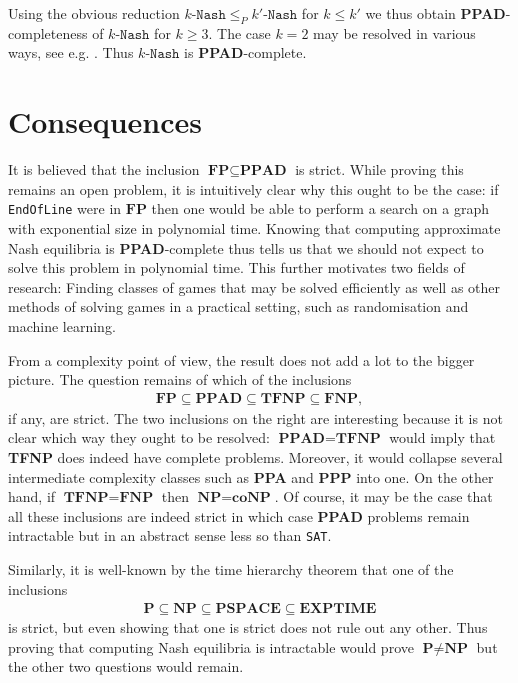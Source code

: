 \documentclass{article}
\begin{document}
Using the obvious reduction $k\texttt{-Nash}\leq_P k'\texttt{-Nash}$
for $k\leq k'$ we thus obtain \textbf{PPAD}-completeness of $k\texttt{-Nash}$
for $k\geq 3$.
The case $k=2$ may be resolved in various ways, see e.g.
\cite{chen2007}. Thus $k\texttt{-Nash}$ is \textbf{PPAD}-complete.

\section{Consequences}

It is believed that the inclusion $\textbf{FP}\subseteq\textbf{PPAD}$ is strict.
While proving this remains an open problem, it is intuitively clear why this
ought to be the case: if \texttt{EndOfLine} were in $\textbf{FP}$ then one
would be able to perform a search on a graph with exponential size in
polynomial time. Knowing that computing approximate Nash equilibria is
\textbf{PPAD}-complete thus tells us that we should not expect to solve
this problem in polynomial time. This further motivates two fields of
research: Finding classes of games that may be solved efficiently as
well as other methods of solving games in a practical setting, such as
randomisation and machine learning.

From a complexity point of view, the result does not add a lot to the
bigger picture. The question remains of which of the inclusions
\begin{align*}
  \textbf{FP} \subseteq \textbf{PPAD} \subseteq \textbf{TFNP} \subseteq
  \textbf{FNP},
\end{align*}
if any, are strict. The two inclusions on the right are interesting
because it is not clear which way they ought to be resolved:
$\textbf{PPAD}=\textbf{TFNP}$ would imply that \textbf{TFNP} does
indeed have complete problems. Moreover, it would collapse
several intermediate complexity classes such as \textbf{PPA}
and \textbf{PPP} into one. On the other hand, if
$\textbf{TFNP}=\textbf{FNP}$ then $\textbf{NP}=\textbf{coNP}$.
\cite{goldberg2018} Of course, it may be the case that all these
inclusions are indeed strict in which case \textbf{PPAD} problems
remain intractable but in an abstract sense less so than \texttt{SAT}.

Similarly, it is well-known by the time hierarchy theorem that
one of the inclusions
\begin{align*}
  \textbf{P}\subseteq\textbf{NP}\subseteq\textbf{PSPACE}\subseteq\textbf{EXPTIME}
\end{align*}
is strict, but even showing that one is strict does not rule out
any other. Thus proving that computing Nash equilibria
is intractable would prove $\textbf{P}\neq\textbf{NP}$ but the
other two questions would remain.

\printbibliography
\end{document}
